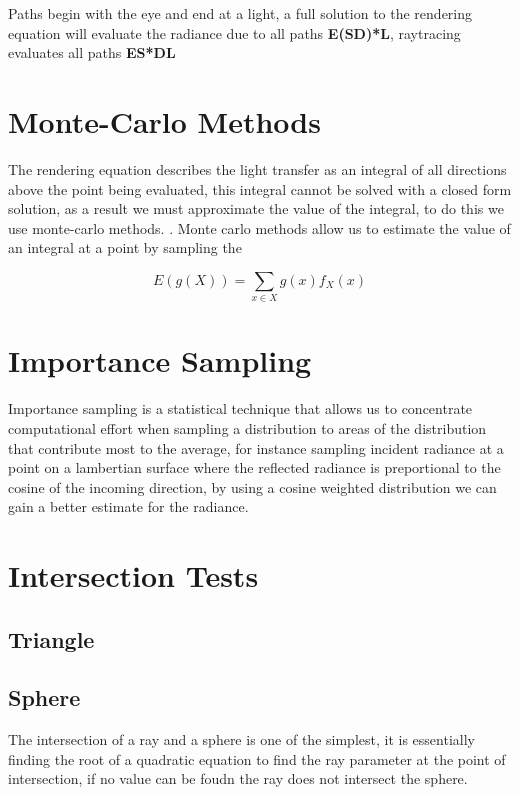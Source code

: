 Paths begin with the eye and end at a light, a full solution to the rendering equation will evaluate the radiance due
to all paths \textbf{E(S\textbar D)*L}, raytracing evaluates all paths \textbf{ES*DL}

\section{Monte-Carlo Methods}
The rendering equation describes the light transfer as an integral of all directions above the point being evaluated, this
integral cannot be solved with a closed form solution, as a result we must approximate the value of the integral, to do this
we use monte-carlo methods. . Monte carlo methods allow us to estimate the value of an integral at a point
by sampling the 

\begin{equation}
E\left(g\left(X\right)\right) = \sum\limits_{x \in X} g\left(x\right)f_X\left(x\right)
\end{equation}


\section{Importance Sampling}
Importance sampling is a statistical technique that allows us to concentrate computational effort when sampling a distribution
to areas of the distribution that contribute most to the average, for instance sampling incident radiance at a point on a lambertian
surface where the reflected radiance is preportional to the cosine of the incoming direction, by using a cosine weighted distribution
we can gain a better estimate for the radiance.


\section{Intersection Tests}
\subsection{Triangle}
\subsection{Sphere}
The intersection of a ray and a sphere is one of the simplest, it is essentially finding the root of a quadratic equation to
find the ray parameter at the point of intersection, if no value can be foudn the ray does not intersect the sphere.
